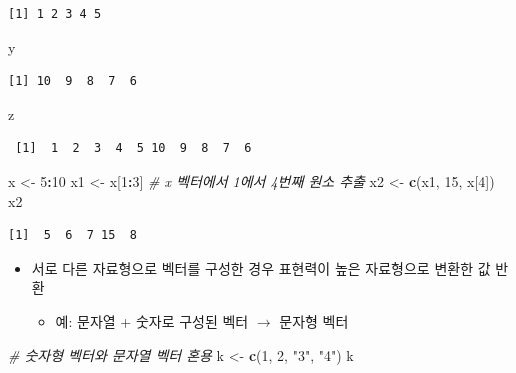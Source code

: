 \documentclass[
  11pt,
]{krantz}
\newenvironment{Shaded}{\begin{snugshade}}{\end{snugshade}}
\newcommand{\CommentTok}[1]{\textcolor[rgb]{0.37,0.37,0.37}{\textit{#1}}}
\newcommand{\DecValTok}[1]{\textcolor[rgb]{0.06,0.06,0.06}{#1}}
\newcommand{\KeywordTok}[1]{\textcolor[rgb]{0.27,0.27,0.27}{\textbf{#1}}}
\newcommand{\NormalTok}[1]{#1}
\newcommand{\OperatorTok}[1]{\textcolor[rgb]{0.43,0.43,0.43}{\textbf{#1}}}
\newcommand{\StringTok}[1]{\textcolor[rgb]{0.5,0.5,0.5}{#1}}
\providecommand{\tightlist}{%
  \setlength{\itemsep}{0pt}\setlength{\parskip}{0pt}}
\begin{document}
\begin{verbatim}
[1] 1 2 3 4 5
\end{verbatim}

\begin{Shaded}
\begin{Highlighting}[]
\NormalTok{y}
\end{Highlighting}
\end{Shaded}

\begin{verbatim}
[1] 10  9  8  7  6
\end{verbatim}

\begin{Shaded}
\begin{Highlighting}[]
\NormalTok{z}
\end{Highlighting}
\end{Shaded}

\begin{verbatim}
 [1]  1  2  3  4  5 10  9  8  7  6
\end{verbatim}

\begin{Shaded}
\begin{Highlighting}[]
\NormalTok{x <-}\StringTok{ }\DecValTok{5}\OperatorTok{:}\DecValTok{10}
\NormalTok{x1 <-}\StringTok{ }\NormalTok{x[}\DecValTok{1}\OperatorTok{:}\DecValTok{3}\NormalTok{] }\CommentTok{# x 벡터에서 1에서 4번째 원소 추출}
\NormalTok{x2 <-}\StringTok{ }\KeywordTok{c}\NormalTok{(x1, }\DecValTok{15}\NormalTok{, x[}\DecValTok{4}\NormalTok{])}
\NormalTok{x2}
\end{Highlighting}
\end{Shaded}

\begin{verbatim}
[1]  5  6  7 15  8
\end{verbatim}

\normalsize

\begin{itemize}
\tightlist
\item
  서로 다른 자료형으로 벡터를 구성한 경우 표현력이 높은 자료형으로 변환한 값 반환

  \begin{itemize}
  \tightlist
  \item
    예: 문자열 + 숫자로 구성된 벡터 \(\rightarrow\) 문자형 벡터
  \end{itemize}
\end{itemize}

\footnotesize

\begin{Shaded}
\begin{Highlighting}[]
\CommentTok{# 숫자형 벡터와 문자열 벡터 혼용}
\NormalTok{k <-}\StringTok{ }\KeywordTok{c}\NormalTok{(}\DecValTok{1}\NormalTok{, }\DecValTok{2}\NormalTok{, }\StringTok{"3"}\NormalTok{, }\StringTok{"4"}\NormalTok{)}
\NormalTok{k}
\end{Highlighting}
\end{Shaded}
\end{document}
